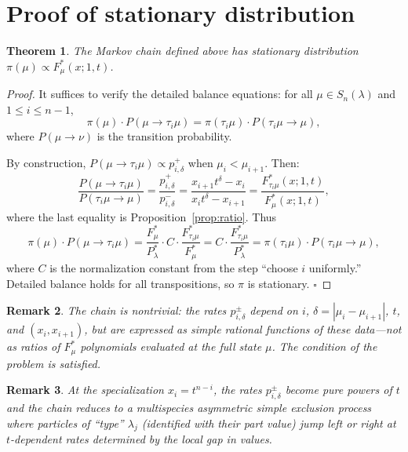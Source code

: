 \documentclass[12pt]{article}
\newtheorem{theorem}{Theorem}
\newtheorem{remark}[theorem]{Remark}
\begin{document}
\section*{Proof of stationary distribution}

\begin{theorem}
  The Markov chain defined above has stationary distribution $\pi(\mu) \propto F^*_\mu(x;1,t)$.
\end{theorem}

\begin{proof}
It suffices to verify the detailed balance equations: for all $\mu \in S_n(\lambda)$ and $1 \leq i \leq n-1$,
\[
  \pi(\mu)\cdot P(\mu\to\tau_i\mu) = \pi(\tau_i\mu)\cdot P(\tau_i\mu\to\mu),
\]
where $P(\mu\to\nu)$ is the transition probability.

By construction, $P(\mu\to\tau_i\mu) \propto p_{i,\delta}^+$ when $\mu_i < \mu_{i+1}$.  Then:
\[
  \frac{P(\mu\to\tau_i\mu)}{P(\tau_i\mu\to\mu)}
  = \frac{p_{i,\delta}^+}{p_{i,\delta}^-}
  = \frac{x_{i+1}t^\delta - x_i}{x_i t^\delta - x_{i+1}}
  = \frac{F^*_{\tau_i\mu}(x;1,t)}{F^*_\mu(x;1,t)},
\]
where the last equality is Proposition~\ref{prop:ratio}.  Thus
\[
  \pi(\mu)\cdot P(\mu\to\tau_i\mu) = \frac{F^*_\mu}{P^*_\lambda}\cdot C\cdot\frac{F^*_{\tau_i\mu}}{F^*_\mu}
  = C\cdot\frac{F^*_{\tau_i\mu}}{P^*_\lambda}
  = \pi(\tau_i\mu)\cdot P(\tau_i\mu\to\mu),
\]
where $C$ is the normalization constant from the step ``choose $i$ uniformly.''  Detailed balance holds for all transpositions, so $\pi$ is stationary. \hfill$\square$
\end{proof}

\begin{remark}
The chain is nontrivial: the rates $p_{i,\delta}^\pm$ depend on $i$, $\delta = |\mu_i-\mu_{i+1}|$, $t$, and $(x_i,x_{i+1})$, but are expressed as simple rational functions of these data---not as ratios of $F^*_\mu$ polynomials evaluated at the full state $\mu$.  The condition of the problem is satisfied.
\end{remark}

\begin{remark}
At the specialization $x_i = t^{n-i}$, the rates $p_{i,\delta}^\pm$ become pure powers of $t$ and the chain reduces to a multispecies asymmetric simple exclusion process where particles of ``type'' $\lambda_j$ (identified with their part value) jump left or right at $t$-dependent rates determined by the local gap in values.
\end{remark}
\end{document}

